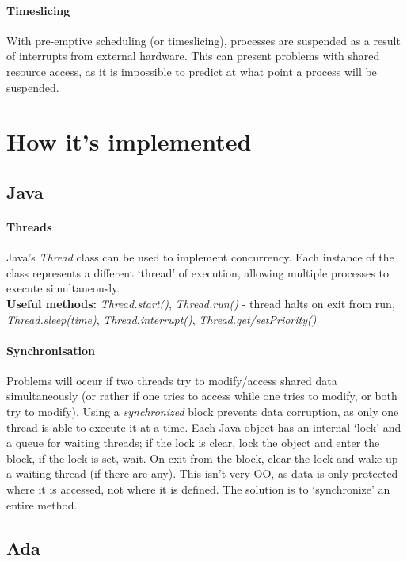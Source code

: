\documentclass[a4paper,oneside]{report}
\begin{document}
    	\paragraph{Timeslicing} With pre-emptive scheduling (or timeslicing), processes are suspended as a result of interrupts from external hardware. This can present problems with shared resource access, as it is impossible to predict at what point a process will be suspended.
    	
  	\section{How it's implemented}
  	
    	\subsection{Java}
      		
      		\paragraph{Threads} Java's \emph{Thread} class can be used to implement concurrency. Each instance of the class represents a different `thread' of execution, allowing multiple processes to execute simultaneously.\\ 
\textbf{Useful methods:} \emph{Thread.start()}, \emph{Thread.run()} - thread halts on exit from run, \emph{Thread.sleep(time)}, \emph{Thread.interrupt()}, \emph{Thread.get/setPriority()}

      		\paragraph{Synchronisation} Problems will occur if two threads try to modify/access shared data simultaneously (or rather if one tries to access while one tries to modify, or both try to modify). Using a \emph{synchronized} block prevents data corruption, as only one thread is able to execute it at a time. Each Java object has an internal ‘lock’ and a queue for waiting threads; if the lock is clear, lock the object and enter the block, if the lock is set, wait. On exit from the block, clear the lock and wake up a waiting thread (if there are any). This isn't very OO, as data is only protected where it is accessed, not where it is defined. The solution is to `synchronize' an entire method.
      		
    	\subsection{Ada}
\end{document}
